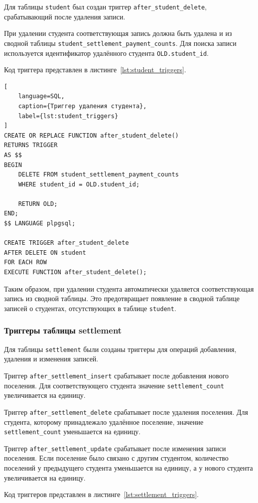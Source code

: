 Для таблицы \texttt{student} был создан триггер \texttt{after\_student\_delete}, срабатывающий после удаления записи.

При удалении студента соответствующая запись должна быть удалена и из сводной таблицы
\texttt{student\_settlement\_payment\_counts}. Для поиска записи используется идентификатор удалённого студента \texttt{OLD.student\_id}.

Код триггера представлен в листинге~\ref{lst:student_triggers}.

\begin{lstlisting}[
    language=SQL,
    caption={Триггер удаления студента},
    label={lst:student_triggers}
]
CREATE OR REPLACE FUNCTION after_student_delete()
RETURNS TRIGGER
AS $$
BEGIN
    DELETE FROM student_settlement_payment_counts
    WHERE student_id = OLD.student_id;

    RETURN OLD;
END;
$$ LANGUAGE plpgsql;

CREATE TRIGGER after_student_delete
AFTER DELETE ON student
FOR EACH ROW
EXECUTE FUNCTION after_student_delete();
\end{lstlisting}

Таким образом, при удалении студента автоматически удаляется соответствующая запись из сводной таблицы. Это предотвращает появление в сводной таблице записей о студентах, отсутствующих в таблице \texttt{student}.

\subsubsection{Триггеры таблицы settlement}

Для таблицы \texttt{settlement} были созданы триггеры для операций добавления, удаления и изменения записей.

Триггер \texttt{after\_settlement\_insert} срабатывает после добавления нового поселения. Для соответствующего студента значение \texttt{settlement\_count} увеличивается на единицу.

Триггер \texttt{after\_settlement\_delete} срабатывает после удаления поселения. Для студента, которому принадлежало удалённое поселение, значение \texttt{settlement\_count} уменьшается на единицу.

Триггер \texttt{after\_settlement\_update} срабатывает после изменения записи поселения. Если поселение было связано с другим студентом, количество поселений у предыдущего студента уменьшается на единицу, а у нового студента увеличивается на единицу.

Код триггеров представлен в листинге~\ref{lst:settlement_triggers}.

